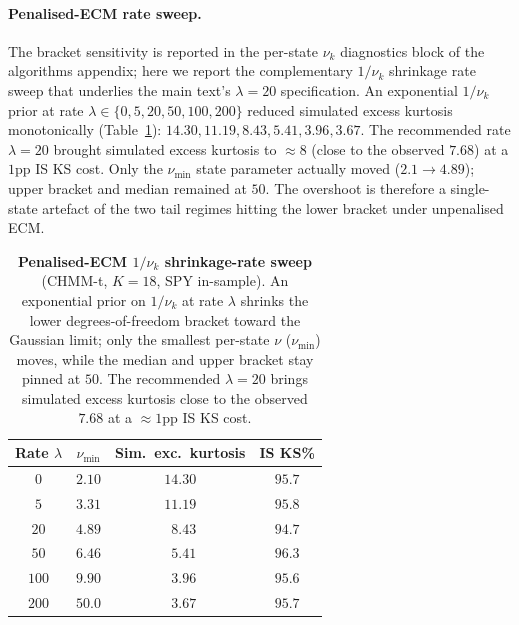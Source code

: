 \paragraph{Penalised-ECM rate sweep.}
The bracket sensitivity is reported in the per-state $\nu_k$ diagnostics block of the algorithms appendix; here we report the complementary $1/\nu_k$ shrinkage rate sweep that underlies the main text's $\lambda = 20$ specification. An exponential $1/\nu_k$ prior at rate $\lambda \in \{0, 5, 20, 50, 100, 200\}$ reduced simulated excess kurtosis monotonically (Table~\ref{tab:nu_shrinkage}): $14.30, 11.19, 8.43, 5.41, 3.96, 3.67$. The recommended rate $\lambda = 20$ brought simulated excess kurtosis to $\approx 8$ (close to the observed $7.68$) at a $1$pp IS KS cost. Only the $\nu_{\min}$ state parameter actually moved ($2.1 \to 4.89$); upper bracket and median remained at $50$. The overshoot is therefore a single-state artefact of the two tail regimes hitting the lower bracket under unpenalised ECM.

\begin{table}[!htbp]
\centering
\small
\caption{\textbf{Penalised-ECM $1/\nu_k$ shrinkage-rate sweep} (CHMM-t, $K = 18$, SPY in-sample). An exponential prior on $1/\nu_k$ at rate $\lambda$ shrinks the lower degrees-of-freedom bracket toward the Gaussian limit; only the smallest per-state $\nu$ ($\nu_{\min}$) moves, while the median and upper bracket stay pinned at $50$. The recommended $\lambda = 20$ brings simulated excess kurtosis close to the observed $7.68$ at a $\approx 1$pp IS KS cost.}
\label{tab:nu_shrinkage}
\begin{tabular}{c c c c}
\toprule
Rate $\lambda$ & $\nu_{\min}$ & Sim.\ exc.\ kurtosis & IS KS\% \\
\midrule
$0$   & $2.10$ & $14.30$ & $95.7$ \\
$5$   & $3.31$ & $11.19$ & $95.8$ \\
$20$  & $4.89$ & $\phantom{0}8.43$ & $94.7$ \\
$50$  & $6.46$ & $\phantom{0}5.41$ & $96.3$ \\
$100$ & $9.90$ & $\phantom{0}3.96$ & $95.6$ \\
$200$ & $50.0$ & $\phantom{0}3.67$ & $95.7$ \\
\bottomrule
\end{tabular}
\end{table}

